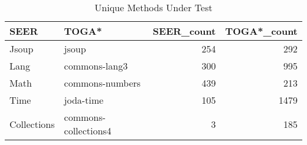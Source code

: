 \begin{table}
\centering
\caption{Unique Methods Under Test}
\label{tab:common_unique_MUT}
\begin{tabular}{llrr}
\toprule
        SEER &                 TOGA* &  SEER\_count &  TOGA*\_count \\
\midrule
       Jsoup &                 jsoup &         254 &          292 \\
        Lang &         commons-lang3 &         300 &          995 \\
        Math &       commons-numbers &         439 &          213 \\
        Time &             joda-time &         105 &         1479 \\
 Collections &  commons-collections4 &           3 &          185 \\
\bottomrule
\end{tabular}
\end{table}
